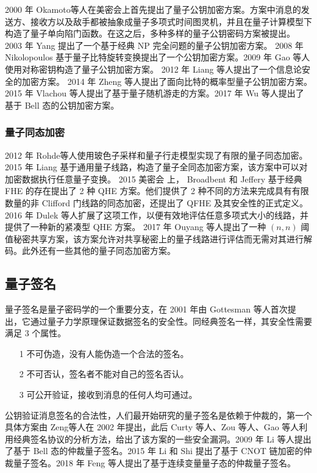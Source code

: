 2000 年 Okamoto等人在美密会上首先提出了量子公钥加密方案。方案中消息的发送方、接收方以及敌手都被抽象成量子多项式时间图灵机，并且在量子计算模型下构造了量子单向陷门函数。在这之后，多种多样的量子公钥密码方案被提出。 2003 年 Yang 提出了一个基于经典 NP 完全问题的量子公钥加密方案。 2008 年 Nikolopoulos 基于量子比特旋转变换提出了一个公钥加密方案。2009 年 Gao 等人使用对称密钥构造了量子公钥加密方案。 2012 年 Liang 等人提出了一个信息论安全的加密方案。 2014 年 Zheng 等人提出了面向比特的概率型量子公钥加密方案。2015 年 Vlachou 等人提出了基于量子随机游走的方案。2017 年 Wu 等人提出了基于 Bell 态的公钥加密方案。

\subsubsection{量子同态加密}

2012 年 Rohde等人使用玻色子采样和量子行走模型实现了有限的量子同态加密。2015 年 Liang 基于通用量子线路，构造了量子全同态加密方案，该方案中可以对加密数据执行任意量子变换。 2015 美密会 上， Broadbent 和 Jeffery 基于经典 FHE 的存在提出了 2 种 QHE 方案。他们提供了 2 种不同的方法来完成具有有限数量的非 Clifford 门线路的同态加密，还提出了 QFHE 及其安全性的正式定义。 2016 年 Dulek 等人扩展了这项工作，以便有效地评估任意多项式大小的线路，并提供了一种新的紧凑型 QHE 方案。 2017 年 Ouyang 等人提出了一种 $(n,n)$ 阈值秘密共享方案，该方案允许对共享秘密上的量子线路进行评估而无需对其进行解码。此外还有一些其他的量子同态加密方案。

\subsection{量子签名}

量子签名是量子密码学的一个重要分支，在 2001 年由 Gottesman 等人首次提出，它通过量子力学原理保证数据签名的安全性。同经典签名一样，其安全性需要满足 3 个属性。

\begin{itemize}
\item [1] 不可伪造，没有人能伪造一个合法的签名。
\item [2] 不可否认，签名者不能对自己的签名否认。
\item [3] 可公开验证，接收到消息的任何人均可通过。
\end{itemize}

公钥验证消息签名的合法性，人们最开始研究的量子签名是依赖于仲裁的，第一个具体方案由 Zeng等人在 2002 年提出，此后 Curty 等人、Zou 等人、Gao 等人利用经典签名协议的分析方法，给出了该方案的一些安全漏洞。2009 年 Li 等人提出了基于 Bell 态的仲裁量子签名。2015 年 Li 和 Shi 提出了基于 CNOT 链加密的仲裁量子签名。2018 年 Feng 等人提出了基于连续变量量子态的仲裁量子签名。

